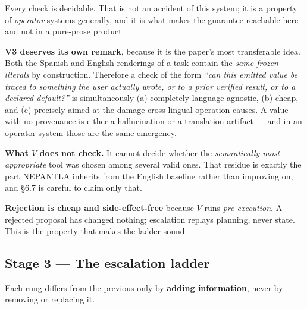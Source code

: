 Every check is decidable. That is not an accident of this system; it is a
property of \emph{operator} systems generally, and it is what makes the
guarantee reachable here and not in a pure-prose product.

\textbf{V3 deserves its own remark}, because it is the paper's most transferable
idea. Both the Spanish and English renderings of a task contain the \emph{same
frozen literals} by construction. Therefore a check of the form \emph{``can this
emitted value be traced to something the user actually wrote, or to a prior
verified result, or to a declared default?''} is simultaneously (a) completely
language-agnostic, (b) cheap, and (c) precisely aimed at the damage
cross-lingual operation causes. A value with no provenance is either a
hallucination or a translation artifact --- and in an operator system those are
the same emergency.

\textbf{What $V$ does not check.} It cannot decide whether the
\emph{semantically most appropriate} tool was chosen among several valid ones.
That residue is exactly the part NEPANTLA inherits from the English baseline
rather than improving on, and \S6.7 is careful to claim only that.

\textbf{Rejection is cheap and side-effect-free} because $V$ runs
\emph{pre-execution}. A rejected proposal has changed nothing; escalation
replays planning, never state. This is the property that makes the ladder sound.

\subsection{Stage 3 --- The escalation ladder}
\label{sec:escalation-ladder}

Each rung differs from the previous only by \textbf{adding information}, never
by removing or replacing it.

